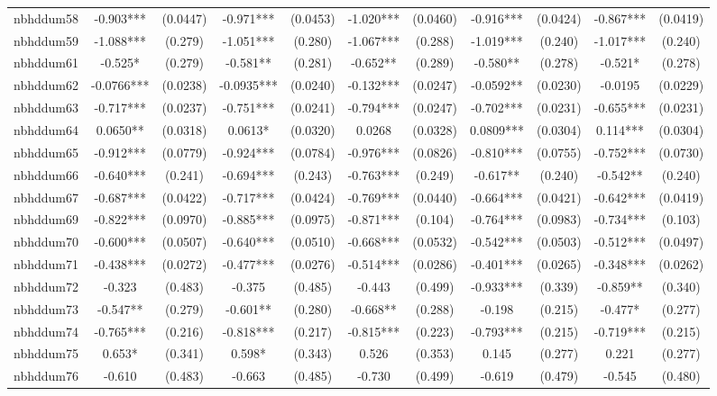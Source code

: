 \documentclass[]{article}
\begin{document}
\begin{tabular}{lcccccccccc}
nbhddum58 & -0.903*** & (0.0447) & -0.971*** & (0.0453) & -1.020*** & (0.0460) & -0.916*** & (0.0424) & -0.867*** & (0.0419) \\
nbhddum59 & -1.088*** & (0.279) & -1.051*** & (0.280) & -1.067*** & (0.288) & -1.019*** & (0.240) & -1.017*** & (0.240) \\
nbhddum61 & -0.525* & (0.279) & -0.581** & (0.281) & -0.652** & (0.289) & -0.580** & (0.278) & -0.521* & (0.278) \\
nbhddum62 & -0.0766*** & (0.0238) & -0.0935*** & (0.0240) & -0.132*** & (0.0247) & -0.0592** & (0.0230) & -0.0195 & (0.0229) \\
nbhddum63 & -0.717*** & (0.0237) & -0.751*** & (0.0241) & -0.794*** & (0.0247) & -0.702*** & (0.0231) & -0.655*** & (0.0231) \\
nbhddum64 & 0.0650** & (0.0318) & 0.0613* & (0.0320) & 0.0268 & (0.0328) & 0.0809*** & (0.0304) & 0.114*** & (0.0304) \\
nbhddum65 & -0.912*** & (0.0779) & -0.924*** & (0.0784) & -0.976*** & (0.0826) & -0.810*** & (0.0755) & -0.752*** & (0.0730) \\
nbhddum66 & -0.640*** & (0.241) & -0.694*** & (0.243) & -0.763*** & (0.249) & -0.617** & (0.240) & -0.542** & (0.240) \\
nbhddum67 & -0.687*** & (0.0422) & -0.717*** & (0.0424) & -0.769*** & (0.0440) & -0.664*** & (0.0421) & -0.642*** & (0.0419) \\
nbhddum69 & -0.822*** & (0.0970) & -0.885*** & (0.0975) & -0.871*** & (0.104) & -0.764*** & (0.0983) & -0.734*** & (0.103) \\
nbhddum70 & -0.600*** & (0.0507) & -0.640*** & (0.0510) & -0.668*** & (0.0532) & -0.542*** & (0.0503) & -0.512*** & (0.0497) \\
nbhddum71 & -0.438*** & (0.0272) & -0.477*** & (0.0276) & -0.514*** & (0.0286) & -0.401*** & (0.0265) & -0.348*** & (0.0262) \\
nbhddum72 & -0.323 & (0.483) & -0.375 & (0.485) & -0.443 & (0.499) & -0.933*** & (0.339) & -0.859** & (0.340) \\
nbhddum73 & -0.547** & (0.279) & -0.601** & (0.280) & -0.668** & (0.288) & -0.198 & (0.215) & -0.477* & (0.277) \\
nbhddum74 & -0.765*** & (0.216) & -0.818*** & (0.217) & -0.815*** & (0.223) & -0.793*** & (0.215) & -0.719*** & (0.215) \\
nbhddum75 & 0.653* & (0.341) & 0.598* & (0.343) & 0.526 & (0.353) & 0.145 & (0.277) & 0.221 & (0.277) \\
nbhddum76 & -0.610 & (0.483) & -0.663 & (0.485) & -0.730 & (0.499) & -0.619 & (0.479) & -0.545 & (0.480) \\

\end{tabular}
\end{document}
